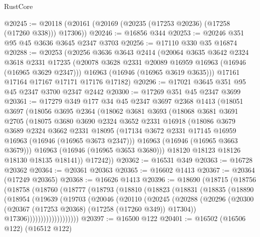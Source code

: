 \begin{lexlean}{RustCore}
\begin{coremodule}
@20245 := @20118 (@20161 (@20169 (@20235 (@17253 @20236) (@17258 (@17260 @338))) @17306))
@20246 := @16856 @344
@20253 := @20246 @351 @95 @45 @3636 @3645 @2347 @3703
@20256 := @17110 @330 @35 @16874
@20288 := @20253
    (@20256
      @3636
      @3643
      @2414
      (@20064
        @3635
        @3642
        @2324
        @3618
        @2331
        @17235
        (@20078 @3628 @2331 @20089 @16959 @16963 (@16946 (@16965 @3629 @2347)))
        @16963
        (@16946 (@16965 @3619 @3635)))
      @17161
      @17164
      @17167
      @17171
      @17176
      @17182)
@20296 := @17021 @3645 @351 @95 @45 @2347 @3700 @2347 @2442
@20300 := @17269 @351 @45 @2347 @3699
@20361 := @17279
    @349
    @177
    @34
    @45
    @2347
    @3697
    @2368
    @1413
    (@18051
      @3697
      (@18056
        @3695
        @2364
        (@18062
          @3681
          @3693
          (@18068
            @3681
            @3691
            @2705
            (@18075
              @3680
              @3690
              @2324
              @3652
              @2331
              @16918
              (@18086
                @3679
                @3689
                @2324
                @3662
                @2331
                @18095
                (@17134 @3672 @2331 @17145 @16959 @16963 (@16946 (@16965 @3673 @2347)))
                @16963
                (@16946 (@16965 @3663 @3679)))
              @16963
              (@16946 (@16965 @3653 @3680)))
            @18120
            @18123
            @18126
            @18130
            @18135
            @18141))
        @17242))
@20362 := @16531 @349
@20363 := @16728 @20362
@20364 := @20361 @20363
@20365 := @16602 @1413
@20367 := @20364 (@17249 @20365)
@20368 := @16626 @1413
@20396 := @18690
    (@18715
      (@18756
        (@18758
          (@18760
            (@18777
              (@18793
                (@18810
                  (@18823
                    (@18831
                      (@18835
                        (@18890
                          (@18954
                            (@19639
                              (@19703
                                (@20046
                                  (@20110
                                    (@20245
                                      (@20288
                                        (@20296
                                          (@20300
                                            (@20367 (@17253 @20368) (@17258 (@17260 @349)) @17304))
                                          @17306)))))))))))))))))))
@20397 := @16500 @122
@20401 := @16502 (@16506 @122) (@16512 @122)

\end{coremodule}
\end{lexlean}
